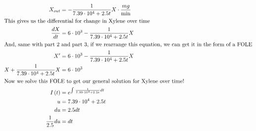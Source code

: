 \documentclass[12pt]{article}
\begin{document}
\begin{align}
  X_{out}                                                                                  & =-\frac{1}{7.39\cdot10^{4}+2.5t}X\cdot\frac{mg}{\min}                                                                                                                     \\
  \intertext{This gives us the differential for change in Xylene over time}
  \frac{dX}{dt}                                                                            & =6\cdot10^{3}-\frac{1}{7.39\cdot10^{4}+2.5t}X                                                                                                                             \\
  \intertext{And, same with part 2 and part 3, if we rearrange this equation, we can get it in the form of a FOLE}
  X'                                                                                       & =6\cdot10^{3}-\frac{1}{7.39\cdot10^{4}+2.5t}X                                                                                                                             \\
  X+\frac{1}{7.39\cdot10^{4}+2.5t}X                                                        & =6\cdot10^{3}                                                                                                                                                             \\
  \intertext{Now we solve this FOLE to get our general solution for Xylene over time!}
  I\left(t\right)                                                                          & =e^{\int_{ }^{ }\frac{1}{7.39\cdot10^{4}+2.5t}dt}                                                                                                                         \\
  u                                                                                        & =7.39\cdot10^{4}+2.5t                                                                                                                                                     \\
  du                                                                                       & =2.5dt                                                                                                                                                                    \\
  \frac{1}{2.5}du                                                                          & =dt                                                                                                                                                                       \\

\end{align}
\end{document}
